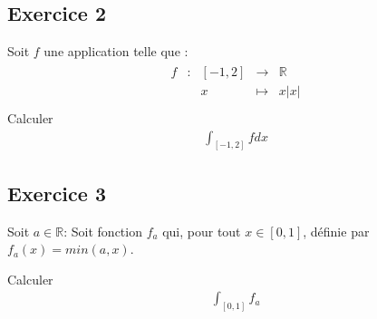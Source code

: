 \documentclass[letterpaper,10pt,french]{sphinxmanual}
\begin{document}
\subsection{Exercice 2}
\label{\detokenize{exo1:exercice-2}}
\sphinxAtStartPar
Soit \(f\) une application telle que :
\begin{equation*}
\begin{split}
\begin{array}{ccccc}
f & : & [-1, 2] & \to & \mathbb R \\
 & & x & \mapsto &  x|x|\\
\end{array}
\end{split}
\end{equation*}
\sphinxAtStartPar
Calculer
\begin{equation*}
\begin{split}
\int_{[-1, 2]} f dx
\end{split}
\end{equation*}

\subsection{Exercice 3}
\label{\detokenize{exo1:exercice-3}}
\sphinxAtStartPar
Soit \(a\in \mathbb R\):
Soit fonction \(f_a\) qui, pour tout \(x \in [0, 1]\), définie par \(f_a(x) = min(a, x)\).

\sphinxAtStartPar
Calculer
\begin{equation*}
\begin{split}\int_{[0, 1]} f_a
\end{split}
\end{equation*}
\end{document}
